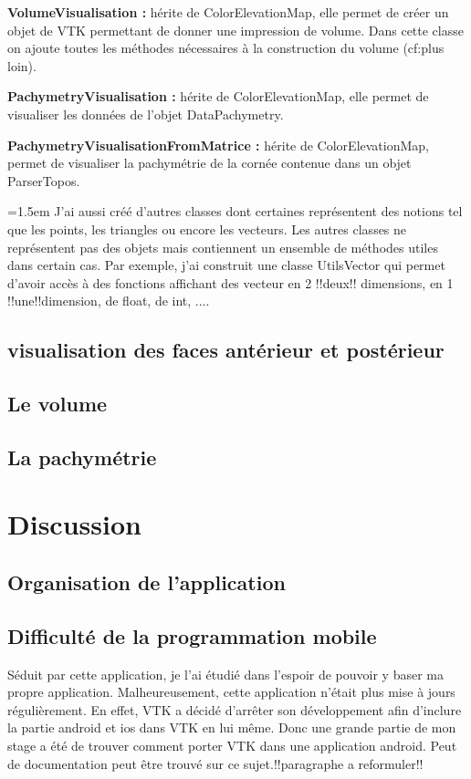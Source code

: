 \documentclass[a4paper,12pt]{article}
\begin{document}
\textbf{VolumeVisualisation : }
hérite de ColorElevationMap, elle permet de créer un objet de VTK permettant de donner une impression de volume. Dans cette classe on ajoute toutes les méthodes nécessaires à la construction du volume (cf:plus loin).

\textbf{PachymetryVisualisation : }
hérite de ColorElevationMap, elle permet de visualiser les données de l'objet DataPachymetry.

\textbf{PachymetryVisualisationFromMatrice : }
hérite de ColorElevationMap, permet de visualiser la pachymétrie de la cornée contenue dans un objet ParserTopos.

\vspace{0.25cm}
\parindent=1.5em
J'ai aussi créé d'autres classes dont certaines représentent des notions tel que les points, les triangles ou encore les vecteurs. Les autres classes ne représentent pas des objets mais contiennent un ensemble de méthodes utiles dans certain cas. Par exemple, j'ai construit une classe UtilsVector qui permet d'avoir accès à des fonctions affichant des vecteur en 2 !!deux!! dimensions, en 1 !!une!!dimension, de float, de int, ....
 
	\subsection{visualisation des faces antérieur et postérieur}
	
	\subsection{Le volume}

	\subsection{La pachymétrie}


\newpage
\section{Discussion}
	\subsection{Organisation de l'application}
	\subsection{Difficulté de la programmation mobile}
	 Séduit par cette application, je l'ai étudié dans l'espoir de pouvoir y baser ma propre application. Malheureusement, cette application n'était plus mise à jours régulièrement. En effet, VTK a décidé d'arrêter son développement afin d'inclure la partie android et ios dans VTK en lui même. Donc une grande partie de mon stage a été de trouver comment porter VTK dans une application android. Peut de documentation peut être trouvé sur ce sujet.!!paragraphe a reformuler!!
\end{document}

